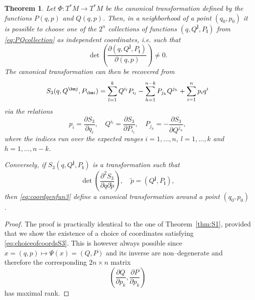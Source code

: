 \documentclass[english,fontsize=11pt,paper=a5,oneside]{scrbook}
\let\d\relax
\DeclareMathOperator{\d}{d}
\newtheorem{theorem}{Theorem}[chapter]
\theoremstyle{definition}
\begin{document}
\begin{theorem}
    Let $\Phi:T^*M \to T^* M$ be the canonical transformation defined by the functions $P(q,p)$ and $Q(q,p)$.
    Then, in a neighborhood of a point $(q_0, p_0)$ it is possible to choose one of the $2^n$ collections of functions $(q, Q^{\bm j}, P_{\bm i})$ from \eqref{eq:PQcollection} as independent coordinates, i.e. such that
    \begin{equation}\label{eq:choiceofcoordsS3}
        \det\left(\frac{\partial (q, Q^{\bm j}, P_{\bm i})}{\partial(q,p)}\right) \neq 0.
    \end{equation}
    The canonical transformation can then be recovered from
    \begin{equation}
        \d S_3(q, Q^{\bm j}, P_{\bm i}) = \sum_{l=1}^k Q^{i_l} \d P_{i_l} -\sum_{h=1}^{n-k} P_{j_h} \d Q^{j_h} + \sum_{i=1}^n p_i \d q^i
    \end{equation}
    via the relations
    \begin{equation}\label{eq:coordgenfun3}
        p_i = \frac{\partial S_3}{\partial q_i}, \quad
        Q^{i_l} = \frac{\partial S_3}{\partial P_{i_l}}, \quad
        P_{j_h} = -\frac{\partial S_3}{\partial Q^{j_h}}, 
    \end{equation}
    where the indices run over the expected ranges $i=1,\ldots,n$, $l=1,\ldots,k$ and $h = 1,\ldots,n-k$.

    Conversely, if $S_3(q, Q^{\bm j}, P_{\bm i})$ is a transformation such that
    \begin{equation}
        \det\left(\frac{\partial^2 S_3}{\partial q \partial \widetilde p}\right), \quad \widetilde p = (Q^{\bm j}, P_{\bm i}),
    \end{equation}
    then \eqref{eq:coordgenfun3} define a canonical transformation around a point $(q_0, p_0)$.
\end{theorem}

\begin{proof}
    The proof is practically identical to the one of Theorem~\ref{thm:S1}, provided that we show the existence of a choice of coordinates satisfying \eqref{eq:choiceofcoordsS3}.
    This is however always possible since $x=(q,p) \mapsto \Psi(x) = (Q,P)$ and its inverse are non--degenerate and therefore the corresponding $2n\times n$ matrix
    \begin{equation}
        \left(\frac{\partial Q}{\partial p_k}, \frac{\partial P}{\partial p_k}\right)
    \end{equation}
    has maximal rank.
\end{proof}
\end{document}
